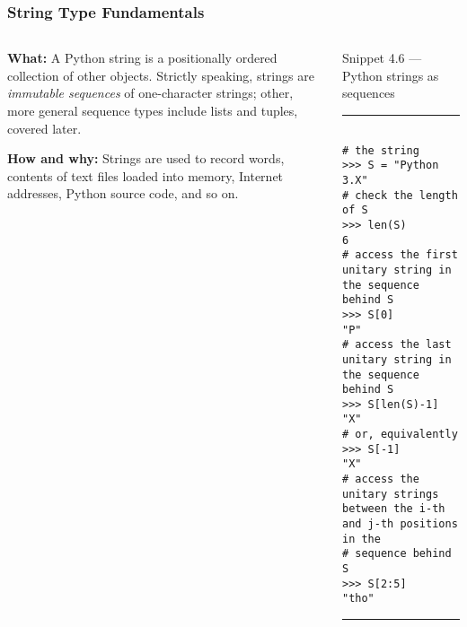 \documentclass[aspectratio=1610]{beamer}
\begin{document}
\begin{frame}[fragile]
    \frametitle{String Type Fundamentals}
    \begin{columns}
        \begin{column}{0.35\textwidth}
            \quad \textbf{What:} A Python string is a positionally ordered collection of other
            objects. Strictly speaking, strings are \textit{immutable
            sequences} of one-character strings; other, more general sequence
            types include lists and tuples, covered later.

            \vspace{1em}
            
            \quad \textbf{How and why:} Strings are used to record words, contents of text files loaded into memory, Internet addresses, Python source code, and so on.
        \end{column}
        \begin{column}{0.60\textwidth}
        \normalsize Snippet 4.6 --- Python strings as sequences
        \rule{\textwidth}{1pt}
        \scriptsize
        \begin{verbatim}
           
# the string
>>> S = "Python 3.X"
# check the length of S
>>> len(S)
6
# access the first unitary string in the sequence behind S 	
>>> S[0]
"P"
# access the last unitary string in the sequence behind S
>>> S[len(S)-1]
"X"
# or, equivalently
>>> S[-1]
"X"
# access the unitary strings between the i-th and j-th positions in the 
# sequence behind S
>>> S[2:5]
"tho"
        \end{verbatim}
        \rule{\textwidth}{1pt}
        \end{column}
    \end{columns}
\end{frame}
\end{document}
